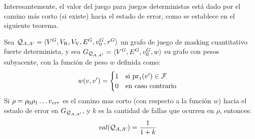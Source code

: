 Interesantemente, el valor del juego para juegos deterministas está dado por el camino más corto (si existe) hacia el estado de error, como se establece en el siguiente teorema.
\begin{theorem}\label{thm:det-games} Sea  $\mathcal{Q}_{A, A'} = \langle V^G, V_{\mathrm{R}},V_{\mathrm{V}}, E^G, v_0^G, \mathit{r}^G \rangle$ un grafo de juego de masking cuantitativo fuerte determinista,
y sea  $G_{\mathcal{Q}_{A, A'}} = \langle V^G,  E^G, v_0^G, w \rangle$ su grafo con pesos subyacente, con la función de peso $w$ 
definida como:
\[
w(v, v') =
\begin{cases} 1 & \text{si $\operatorname{pr}_{1}(v') \in \mathcal{F}$} \\
		      0 & \text{en caso contrario}	 
\end{cases}
\]
	Si $\rho = \rho_0 \rho_1  \dots v_{\mathit{err}}$ es el camino mas corto (con respecto a la función $w$)
hacia el estado de error en $G_{\mathcal{Q}_{A, A'}}$, y $k$ es la cantidad de fallas que ocurren en $\rho$, entonces: 
\[
	\mathit{val}(\mathcal{Q}_{A, A'}) = \frac{1}{1+k}
\]
\end{theorem}
